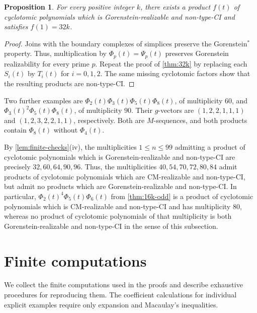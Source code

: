 \documentclass[11pt,a4paper]{amsart}
\newtheorem{proposition}[proposition]{Proposition}
\theoremstyle{definition}
\theoremstyle{remark}
\begin{document}
\begin{proposition}\label{prop:gorenstein-32k}
For every positive integer $k$, there exists a product $f(t)$ of cyclotomic polynomials which is Gorenstein-realizable and non-type-CI and satisfies $f(1)=32k$.
\end{proposition}
\begin{proof}
Joins with the boundary complexes of simplices preserve the Gorenstein$^*$ property. Thus, multiplication by $\Phi_p(t)=\Psi_p(t)$ preserves Gorenstein realizability for every prime $p$. Repeat the proof of \cref{thm:32k} by replacing each $S_i(t)$ by $T_i(t)$ for $i=0,1,2$. The same missing cyclotomic factors show that the resulting products are non-type-CI.
\end{proof}

Two further examples are $\Phi_2(t)\Phi_3(t)\Phi_5(t)\Phi_8(t)$, of multiplicity $60$, and $\Phi_3(t)^2\Phi_5(t)\Phi_8(t)$, of multiplicity $90$. Their $g$-vectors are $(1,2,2,1,1,1)$ and $(1,2,3,2,2,1,1)$, respectively. Both are $M$-sequences, and both products contain $\Phi_8(t)$ without $\Phi_4(t)$.

By \cref{lem:finite-checks}\textup{(iv)}, the multiplicities $1\le n\le99$ admitting a product of cyclotomic polynomials which is Gorenstein-realizable and non-type-CI are precisely $32,60,64,90,96$. Thus, the multiplicities $40,54,70,72,80,84$ admit products of cyclotomic polynomials which are CM-realizable and non-type-CI, but admit no products which are Gorenstein-realizable and non-type-CI. In particular, $\Phi_2(t)^4\Phi_5(t)\Phi_6(t)$ from \cref{thm:16k-odd} is a product of cyclotomic polynomials which is CM-realizable and non-type-CI and has multiplicity $80$, whereas no product of cyclotomic polynomials of that multiplicity is both Gorenstein-realizable and non-type-CI in the sense of this subsection.

\bigskip
\appendix
\section{Finite computations}\label{sec:computation}
We collect the finite computations used in the proofs and describe exhaustive procedures for reproducing them. The coefficient calculations for individual explicit examples require only expansion and Macaulay's inequalities.
\end{document}
